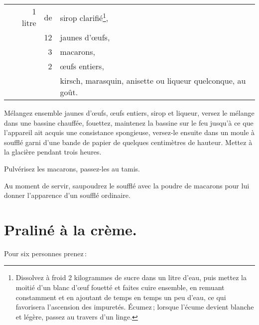 \footnotesize
\begin{longtable}{rrrp{16em}}
        & 1 litre & de & sirop clarifié\footnote{ Dissolvez à froid 2 kilogrammes
                                      de sucre dans un litre d'eau, puis mettez la
                                      moitié d'un blanc d'œuf fouetté et faites cuire
                                      ensemble, en remuant constamment et en ajoutant
                                      de temps en temps un peu d'eau, ce qui favorisera
                                      l'ascension des impuretés. Écumez ; lorsque
                                      l'écume devient blanche et légère, passez au
                                      travers d'un linge.},                                               \\
        &         & 12 & jaunes d'œufs,                                                                   \\
        &         &  3 & macarons,                                                                        \\
        &         &  2 & œufs entiers,                                                                    \\
        &         &    & kirsch, marasquin, anisette ou liqueur quelconque, au goût.                      \\
\end{longtable}
\normalsize

Mélangez ensemble jaunes d'œufs, œufs entiers, sirop et liqueur, versez le
mélange dans une bassine chauffée, fouettez, maintenez la bassine sur le feu
jusqu'à ce que l'appareil ait acquis une consistance spongieuse, versez-le
ensuite dans un moule à soufflé garni d'une bande de papier de quelques
centimètres de hauteur. Mettez à la glacière pendant trois heures.

Pulvérisez les macarons, passez-les au tamis.

Au moment de servir, saupoudrez le soufflé avec la poudre de macarons pour lui
donner l'apparence d'un soufflé ordinaire.

\section*{\centering Praliné à la crème.}
{}

Pour six personnes prenez :

